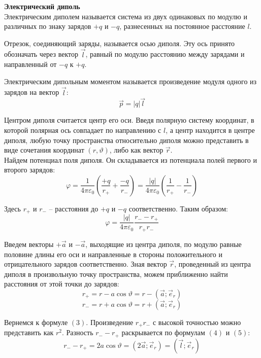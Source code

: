\documentclass{article}
\begin{document}
	\textbf{Электрический диполь}\\

	Электрическим диполем называется система из двух одинаковых по модулю и различных по знаку зарядов $+q$ и $-q$, разнесенных на постоянное расстояние $l$.

	Отрезок, соединяющий заряды, называется осью диполя. Эту ось принято обозначать через вектор $\vec l$, равный по модулю расстоянию между зарядами и направленный от $-q$ к $+q$.

	Электрическим дипольным моментом называется произведение модуля одного из зарядов на вектор $\vec l$:
	\begin{equation}
		\vec p = |q|\vec l
	\end{equation}

	Центром диполя считается центр его оси. Введя полярную систему координат, в которой полярная ось совпадает по направлению с $l$, а центр находится в центре диполя, любую точку пространства относительно диполя можно представить в виде сочетания координат $(r,\vartheta)$, либо как вектор $\vec r$.\\

	Найдем потенциал поля диполя. Он складывается из потенциала полей первого и второго зарядов:
	\begin{equation}
		\varphi = \frac{1}{4\pi\varepsilon_0}(\frac{+q}{r_+}+\frac{-q}{r_-})=\frac{|q|}{4\pi\varepsilon_0}(\frac{1}{r_+}-\frac{1}{r_-})
	\end{equation}

	Здесь $r_+$ и $r_-$ -- расстояния до $+q$ и $-q$ соответственно. Таким образом:
	\begin{equation}
		\varphi = \frac{|q|}{4\pi\varepsilon_0}\frac{r_--r_+}{r_+r_-}
	\end{equation}

	Введем векторы $+\vec a$ и $-\vec a$, выходящие из центра диполя, по модулю равные половине длины его оси и направленные в стороны положительного и отрицательного зарядов соответственно. Зная вектор $\vec r$, проведенный из центра диполя в произвольную точку пространства, можем приближенно найти расстояния от этой точки до зарядов:
	\begin{equation}
		r_+ = r - a\cos\vartheta = r - (\vec a;\vec e_r)
	\end{equation}
	\begin{equation}
		r_- = r + a\cos\vartheta = r + (\vec a;\vec e_r)
	\end{equation}

	Вернемся к формуле $(3)$. Произведение $r_+r_-$ с высокой точностью можно представить как $r^2$. Разность $r_--r_+$ раскрывается по формулам $(4)$ и $(5)$:
	\begin{equation}
		r_--r_+=2a\cos\vartheta=(2\vec a;\vec e_r)=(\vec l;\vec e_r)
	\end{equation}
\end{document}
